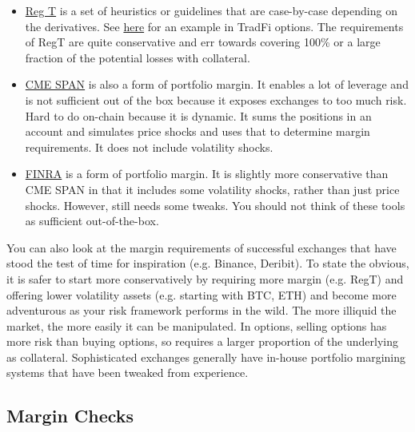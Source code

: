 \documentclass{article}
\begin{document}
\begin{itemize}
    \item \href{https://en.wikipedia.org/wiki/Regulation_T}{Reg T} is a set of heuristics or guidelines that are case-by-case depending on the derivatives. See \href{http://www.themargininvestor.com/option-strategies---reg-t-margin.html}{here} for an example in TradFi options. The requirements of RegT are quite conservative and err towards covering 100\% or a large fraction of the potential losses with collateral. 
    \item \href{https://www.cmegroup.com/clearing/risk-management/span-overview.html}{CME SPAN} is also a form of portfolio margin. It enables a lot of leverage and is not sufficient out of the box because it exposes exchanges to too much risk. Hard to do on-chain because it is dynamic. It sums the positions in an account and simulates price shocks and uses that to determine margin requirements. It does not include volatility shocks.
    \item \href{https://www.finra.org/rules-guidance/key-topics/margin-accounts}{FINRA} is a form of portfolio margin. It is slightly more conservative than CME SPAN in that it includes some volatility shocks, rather than just price shocks. However, still needs some tweaks. You should not think of these tools as sufficient out-of-the-box. 
\end{itemize}

\noindent You can also look at the margin requirements of successful exchanges that have stood the test of time for inspiration (e.g. Binance, Deribit). To state the obvious, it is safer to start more conservatively by requiring more margin (e.g. RegT) and offering lower volatility assets (e.g. starting with BTC, ETH) and become more adventurous as your risk framework performs in the wild. The more illiquid the market, the more easily it can be manipulated. In options, selling options has more risk than buying options, so requires a larger proportion of the underlying as collateral. Sophisticated exchanges generally have in-house portfolio margining systems that have been tweaked from experience. 

\subsection{Margin Checks}
\label{sec:accounthealth}
\end{document}
